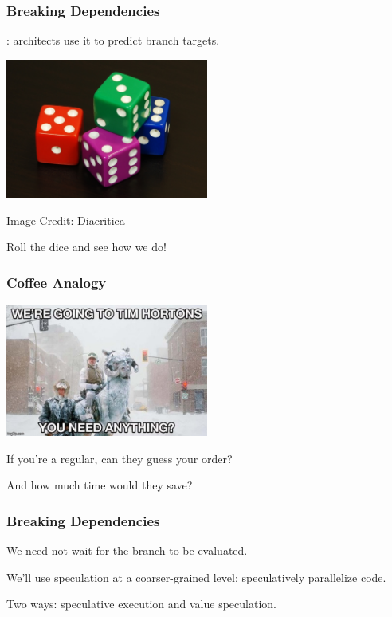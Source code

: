 \begin{frame}
  \frametitle{Breaking Dependencies}

  
  : architects use it to predict
      branch targets.
  
  \begin{center}
  	\includegraphics[width=0.5\textwidth]{images/6sided_dice.jpg}
  \end{center}
  	\hfill Image Credit: Diacritica

Roll the dice and see how we do!

\end{frame}


\begin{frame}
\frametitle{Coffee Analogy}

\begin{center}
	\includegraphics[width=0.5\textwidth]{images/tims.jpg}
\end{center}

If you're a regular, can they guess your order?

And how much time would they save?

\end{frame}

  

\begin{frame}
\frametitle{Breaking Dependencies}

We need not wait for the branch to be evaluated.

We'll use speculation at a coarser-grained level: speculatively parallelize code.

Two ways: \alert{speculative execution} and
      \alert{value speculation}.
  
\end{frame}




